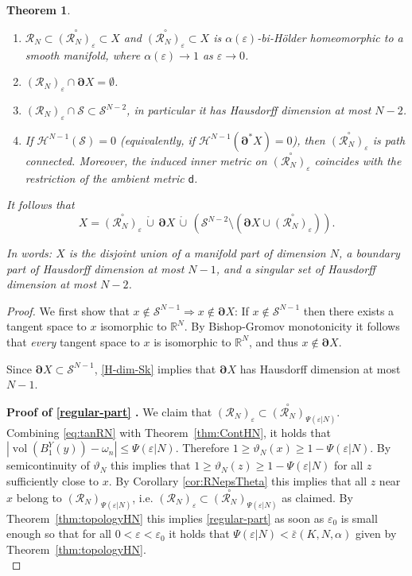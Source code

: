 \documentclass[a4paper]{amsart}
\theoremstyle{plain}
\newtheorem{theorem}[lemma]{Theorem}
\theoremstyle{definition}
\numberwithin{equation}{section}
\newcommand{\R}{\mathbb{R}}
\renewcommand{\S}{\mathcal{S}}
\newcommand{\sfd}{\mathsf d}
\DeclareMathOperator{\vol}{vol}
\newcommand{\cH}{\mathcal{H}}
\newcommand{\eps}{\varepsilon}
\newcommand{\bRCD}{\boldsymbol\partial}
\begin{document}
{\begin{theorem}
\begin{enumerate}
\item \label{regular-part} $\mathcal R_N\subset \overset{\circ}{({\mathcal R}_{N})_{\eps}}\subset X$ and $\overset{\circ}{({\mathcal R}_{N})_{\eps}}\subset X$ is $\alpha(\eps)$-bi-H\"older homeomorphic to a smooth  manifold, where $\alpha(\eps)\to 1$ as $\eps\to0$.
\item\label{regular-no-bry} ${ ({\mathcal R}_{N})_{\eps}}\cap \bRCD X=\emptyset$.
\item \label{reg-intr-sing} ${ ({\mathcal R}_{N})_{\eps}} \cap \S\subset \S^{N-2}$, in particular it has Hausdorff dimension at most $N-2$.
\item\label{reg-connected} If $\cH^{N-1}(\S)=0$ (equivalently, if  $\cH^{N-1}(\bRCD^* X)=0$), then  $\overset{\circ}{({\mathcal R}_{N})_{\eps}}$ is path connected. Moreover, the induced inner metric on $\overset{\circ}{({\mathcal R}_{N})_{\eps}}$ coincides with the restriction of the ambient metric $\sfd$.
\end{enumerate}
It follows that 
$$
X= \overset{\circ}{({\mathcal R}_{N})_{\eps}} \, \mathring\cup \,  \bRCD X \, \mathring\cup  \, (\S^{N-2}\setminus (\bRCD X\cup \overset{\circ}{({\mathcal R}_{N})_{\eps}})).
$$

In words:   $X$  is the disjoint union of a manifold part of dimension $N$, a boundary part of Hausdorff dimension at most $N-1$, and a singular set of Hausdorff dimension at most $N-2$. 
\end{theorem}


\begin{proof}
We first show that $x\notin \S^{N-1} \Rightarrow x\notin \bRCD X$:  If $x\notin \S^{N-1}$ then there exists a tangent space to $x$ isomorphic to $\R^{N}$.  By Bishop-Gromov monotonicity it follows that \emph{every} tangent space to $x$ is isomorphic to $\R^{N}$, and thus $x\notin \bRCD X$.  

Since  $\bRCD X\subset \S^{N-1}$, \eqref{H-dim-Sk}  implies  that $ \bRCD X$  has Hausdorff dimension at most $N-1$.

\textbf{Proof of \eqref{regular-part} .} 
We claim that $({\mathcal R}_{N})_{\eps}\subset  \overset{\circ}{({\mathcal R}_{N})}_{\Psi(\eps|N)}$.
\\ {Combining \eqref{eq:tanRN} with Theorem~\ref{thm:ContHN}}, it holds that $|\vol(B_{1}^{Y}(y))-\omega_n|\le \Psi(\eps|N)$. Therefore $1\ge \vartheta_N(x)\ge 1- \Psi(\eps|N)$. By semicontinuity of $\vartheta_N$ this implies that $1\ge \vartheta_N(z)\ge 1- \Psi(\eps|N)$ for all $z$ sufficiently close to $x$. By Corollary \ref{cor:RNepsTheta} this implies that all $z$ near $x$ belong to ${({\mathcal R}_{N})}_{\Psi(\eps|N)}$, i.e.  $({\mathcal R}_{N})_{\eps}\subset  \overset{\circ}{({\mathcal R}_{N})}_{\Psi(\eps|N)}$ as claimed. By Theorem~\ref{thm:topologyHN} this implies \eqref{regular-part} as soon as $\eps_0$ is small enough so that for all $0<\eps<\eps_0$ it holds that 
$\Psi(\eps|N)< \bar\varepsilon(K,N,\alpha)$ given by Theorem~\ref{thm:topologyHN}.
\\


\end{proof}}
\end{document}

